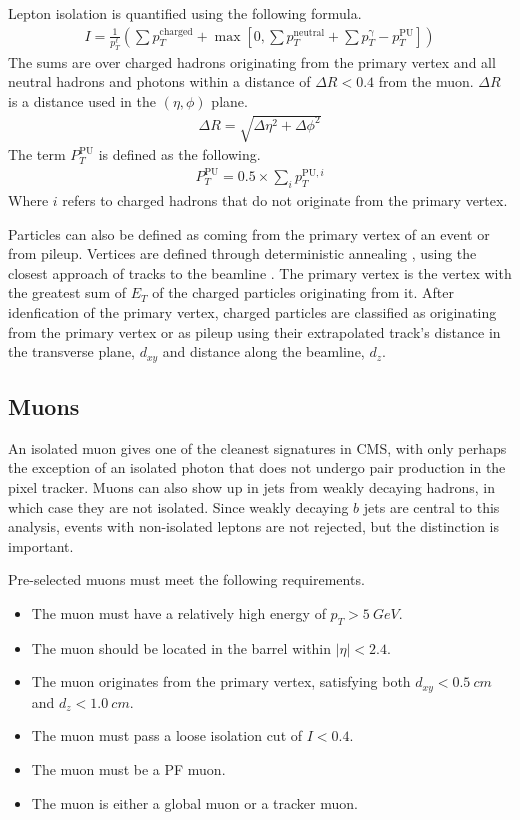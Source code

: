 Lepton isolation is quantified using the following formula.
\begin{gather}
  I = \frac{1}{p_T^\ell} \left(\sum p_T^\mathrm{charged} +
      \max\left[0, \sum p_T^\mathrm{neutral} +
               \sum p_T^\mathrm{\gamma} - p_T^\mathrm{PU}
               \right]\right) \label{eq:isolation}
\end{gather}
The sums are over charged hadrons originating from the primary vertex
and all neutral hadrons and photons
within a distance of $\Delta R < 0.4$ from the muon.
$\Delta R$ is a distance used in the $(\eta, \phi)$ plane.
\begin{gather}
  \Delta R = \sqrt{\Delta\eta^2 + \Delta\phi^2}
\end{gather}
The term $P_T^\mathrm{PU}$ is defined as the following.
\begin{gather}
  P_T^\mathrm{PU} = 0.5 \times \sum_i p_T^{\mathrm{PU},i}
\end{gather}
Where $i$ refers to charged hadrons that do not originate from the primary vertex.

Particles can also be defined as coming from the primary vertex of an event or from pileup.
Vertices are defined through deterministic annealing \cite{726788},
using the closest approach of tracks to the beamline \cite{Collaboration_2014}.
The primary vertex is the vertex with
the greatest sum of $E_T$ of the charged particles originating from it.
After idenfication of the primary vertex,
charged particles are classified as originating from the primary vertex or as pileup
using their extrapolated track's distance in the transverse plane, $d_{xy}$
and distance along the beamline, $d_z$.

\subsection{Muons}

An isolated muon gives one of the cleanest signatures in CMS,
with only perhaps the exception of an isolated photon that does not
undergo pair production in the pixel tracker.
Muons can also show up in jets from weakly decaying hadrons,
in which case they are not isolated.
Since weakly decaying $b$ jets are central to this analysis,
events with non-isolated leptons are not rejected,
but the distinction is important.

Pre-selected muons must meet the following requirements.
\begin{itemize}
\item The muon must have a relatively high energy of $p_T > \SI{5}{GeV}$.
\item The muon should be located in the barrel within $|\eta| < 2.4$.
\item The muon originates from the primary vertex, satisfying both
  $d_{xy} < \SI{0.5}{cm}$ and $d_z < \SI{1.0}{cm}$.
\item The muon must pass a loose isolation cut of $I < 0.4$.
\item The muon must be a PF muon.
\item The muon is either a global muon or a tracker muon.
\end{itemize}

